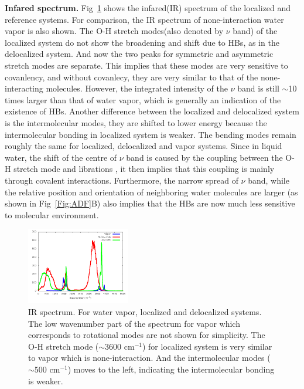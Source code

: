\documentclass[prl,twocolumn,showpacs]{revtex4}
\begin{document}
\textbf{Infared spectrum.} Fig~\ref{Fig:IR} shows the infared(IR) spectrum of the localized and reference systems. For comparison, the IR spectrum of none-interaction water vapor is also shown. The O-H stretch modes(also denoted by $\nu$ band) of the localized system do not show the broadening and shift due to HBs, as in the delocalized system. And now the two peaks for symmetric and asymmetric stretch modes are separate. This implies that these modes are very sensitive to covanlency, and without covanlecy, they are very similar to that of the none-interacting molecules. \new However, the integrated intensity of the $\nu$ band is still $\sim$10 times larger than that of water vapor, which is generally an indication of the existence of HBs. \old Another difference between the localized and delocalized system is the intermolecular modes, they are shifted to lower energy because the intermolecular bonding in localized system is weaker. The bending modes remain roughly the same for localized, delocalized and vapor systems. Since in liquid water, the shift of the centre of $\nu$ band is caused by the coupling between the O-H stretch mode and librations \cite{marechal2006hydrogen}, it then implies that this coupling is mainly through covalent interactions. Furthermore, the narrow spread of $\nu$ band, while the relative position and orientation of neighboring water molecules are larger (as shown in Fig~\ref{Fig:ADF}B) also implies that the HBs are now much less sensitive to molecular environment.

\begin{figure}
\includegraphics[width=0.4\textwidth]{all_ir}
\caption{IR spectrum. For water vapor, localized and delocalized systems. The low wavenumber part of the spectrum for vapor which corresponds to rotational modes are not shown for simplicity.  The O-H stretch mode ($\sim$3600 cm$^{-1}$) for localized system is very similar to vapor which is none-interaction. And the intermolecular modes ($\sim$500 cm$^{-1}$) moves to the left, indicating the intermolecular bonding is weaker. } \label{Fig:IR}
\end{figure}
\end{document}
